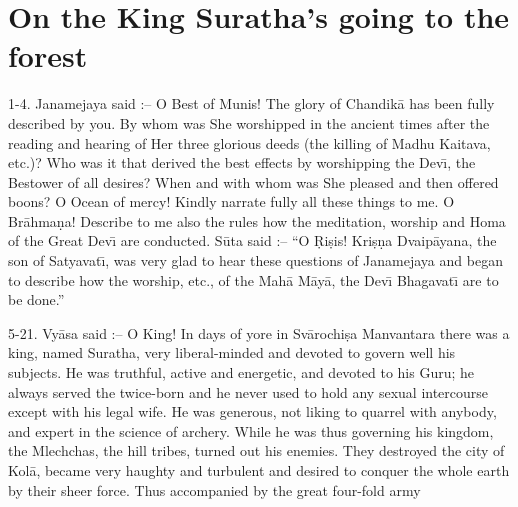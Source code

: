 \chapter{On the King Suratha's going to the forest}

1-4. Janamejaya said :-- O Best of Munis! The glory of Chandik\=a has been fully described by you. By whom was She worshipped in the ancient times after the reading and hearing of Her three glorious deeds (the killing of Madhu Kaitava, etc.)? Who was it that derived the best effects by worshipping the Dev\={\i}, the Bestower of all desires? When and with whom was She pleased and then offered boons? O Ocean of mercy! Kindly narrate fully all these things to me. O Br\=ahma\d{n}a! Describe to me also the rules how the meditation, worship and Homa of the Great Dev\={\i} are conducted. S\=uta said :-- ``O \d{R}i\d{s}is! Kri\d{s}\d{n}a Dvaip\=ayana, the son of Satyavat\={\i}, was very glad to hear these questions of Janamejaya and began to describe how the worship, etc., of the Mah\=a M\=ay\=a, the Dev\={\i} Bhagavat\={\i} are to be done.''

5-21. Vy\=asa said :-- O King! In days of yore in Sv\=arochi\d{s}a Manvantara there was a king, named Suratha, very liberal-minded and devoted to govern well his subjects. He was truthful, active and energetic, and devoted to his Guru; he always served the twice-born and he never used to hold any sexual intercourse except with his legal wife. He was generous, not liking to quarrel with anybody, and expert in the science of archery. While he was thus governing his kingdom, the Mlechchas, the hill tribes, turned out his enemies. They destroyed the city of Kol\=a, became very haughty and turbulent and desired to conquer the whole earth by their sheer force. Thus accompanied by the great four-fold army

